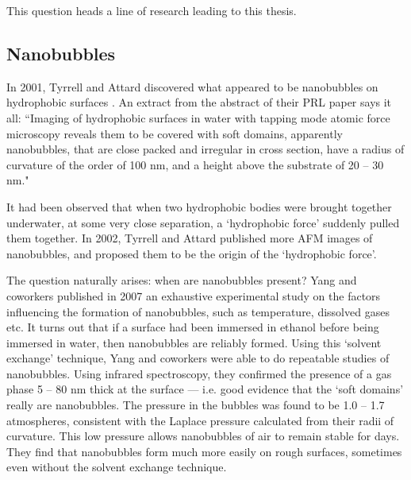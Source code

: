 \documentclass[a4paper]{report}
\begin{document}
This question heads a line of research leading to this thesis.


\subsection{Nanobubbles}

In 2001, Tyrrell and Attard discovered what appeared to be nanobubbles on hydrophobic surfaces \cite{TyrrellAttard2001}.  An extract from the abstract of their PRL paper says it all: ``Imaging of hydrophobic surfaces in water with tapping mode atomic force microscopy reveals them to be covered with soft domains, apparently nanobubbles, that are close packed and irregular in cross section, have a radius of curvature of the order of 100 nm, and a height above the substrate of 20 -- 30 nm."  

It had been observed that when two hydrophobic bodies were brought together underwater, at some very close separation, a `hydrophobic force' suddenly pulled them together.  In 2002, Tyrrell and Attard published \cite{TyrrellAttard2002} more AFM images of nanobubbles, and proposed them to be the origin of the `hydrophobic force'.

\begin{center}
\end{center}

The question naturally arises: when are nanobubbles present?  Yang and coworkers published in 2007 \cite{Yang2007} an exhaustive experimental study on the factors influencing the formation of nanobubbles, such as temperature, dissolved gases etc.  It turns out that if a surface had been immersed in ethanol before being immersed in water, then nanobubbles are reliably formed.  Using this `solvent exchange' technique, Yang and coworkers were able to do repeatable studies of nanobubbles.  Using infrared spectroscopy, they confirmed the presence of a gas phase 5 -- 80 nm thick at the surface --- i.e. good evidence that the `soft domains' really are nanobubbles.  The pressure in the bubbles was found to be 1.0 -- 1.7 atmospheres, consistent with the Laplace pressure calculated from their radii of curvature.  This low pressure allows nanobubbles of air to remain stable for days.  They find that nanobubbles form much more easily on rough surfaces, sometimes even without the solvent exchange technique.
\end{document}
